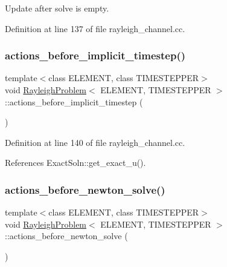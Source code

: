 Update after solve is empty. 



Definition at line 137 of file rayleigh\+\_\+channel.\+cc.

\mbox{\label{classRayleighProblem_a873a81442a28c7616fbe616d9068f8b9}} 
\subsubsection{\texorpdfstring{actions\+\_\+before\+\_\+implicit\+\_\+timestep()}{actions\_before\_implicit\_timestep()}}
{\footnotesize\ttfamily template$<$class E\+L\+E\+M\+E\+NT, class T\+I\+M\+E\+S\+T\+E\+P\+P\+ER$>$ \\
void \hyperlink{classRayleighProblem}{Rayleigh\+Problem}$<$ E\+L\+E\+M\+E\+NT, T\+I\+M\+E\+S\+T\+E\+P\+P\+ER $>$\+::actions\+\_\+before\+\_\+implicit\+\_\+timestep (\begin{DoxyParamCaption}{ }\end{DoxyParamCaption})\hspace{0.3cm}{\ttfamily [inline]}}



Definition at line 140 of file rayleigh\+\_\+channel.\+cc.



References Exact\+Soln\+::get\+\_\+exact\+\_\+u().

\mbox{\label{classRayleighProblem_ab49bdf4a3c9fcb57fa04db8892875668}} 
\subsubsection{\texorpdfstring{actions\+\_\+before\+\_\+newton\+\_\+solve()}{actions\_before\_newton\_solve()}}
{\footnotesize\ttfamily template$<$class E\+L\+E\+M\+E\+NT, class T\+I\+M\+E\+S\+T\+E\+P\+P\+ER$>$ \\
void \hyperlink{classRayleighProblem}{Rayleigh\+Problem}$<$ E\+L\+E\+M\+E\+NT, T\+I\+M\+E\+S\+T\+E\+P\+P\+ER $>$\+::actions\+\_\+before\+\_\+newton\+\_\+solve (\begin{DoxyParamCaption}{ }\end{DoxyParamCaption})\hspace{0.3cm}{\ttfamily [inline]}}



